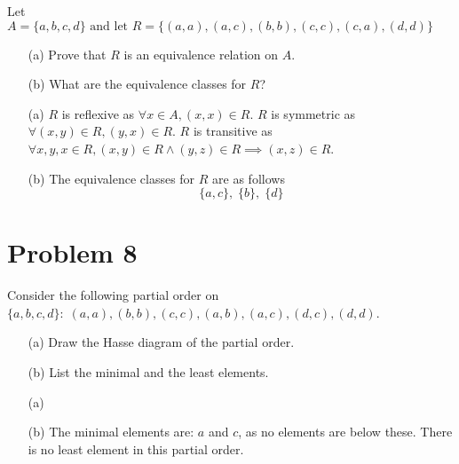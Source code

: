 \documentclass[12pt]{article}
\begin{document}
\begin{tcolorbox}[colback=gray!10, colframe=black, title=Given]
	Let $A=\{a,b,c,d\} \text{ and let } R=\{(a,a),(a,c),(b,b),(c,c),(c,a),(d,d)\}$
	\begin{enumerate}
		\item [(a)] Prove that $R$ is an equivalence relation on $A$.
		\item [(b)] What are the equivalence classes for $R$?
	\end{enumerate}
\end{tcolorbox}

\begin{tcolorbox}[colback=yellow!20, colframe=black, title=Solution]
	\begin{enumerate}
		\item [(a)] $R$ is reflexive as $\forall x\in A, (x,x)\in R$. $R$ is symmetric as $\forall (x,y)\in R, (y,x)\in R$.
		      $R$ is transitive as $\forall x,y,x\in R, (x,y)\in R \land (y,z)\in R \implies (x,z)\in R$.
		\item [(b)] The equivalence classes for $R$ are as follows
		      \[\{a,c\},\; \{b\},\; \{d\}\]
	\end{enumerate}
\end{tcolorbox}
\section*{Problem 8}

\begin{tcolorbox}[colback=gray!10, colframe=black, title=Given]
	Consider the following partial order on\\
	$\{a,b,c,d\}:\;{(a,a),(b,b),(c,c),(a,b),(a,c),(d,c),(d,d)}$.
	\begin{enumerate}
		\item [(a)] Draw the Hasse diagram of the partial order.
		\item [(b)] List the minimal and the least elements.
	\end{enumerate}
\end{tcolorbox}

\begin{tcolorbox}[colback=yellow!20, colframe=black, title=Solution]
	\begin{enumerate}
		\item [(a)] 
		\item [(b)] The minimal elements are: $a$ and $c$, as no elements are below these. There is no least element in this partial order.
	\end{enumerate}
\end{tcolorbox}
\end{document}
